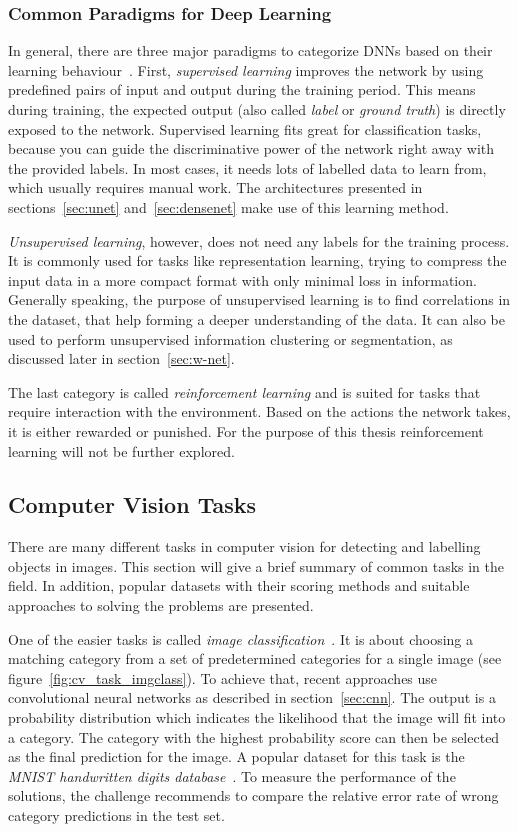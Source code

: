 \subsubsection{Common Paradigms for Deep Learning}
\label{sec:dl_paradigms}
In general, there are three major paradigms to categorize DNNs based on their learning behaviour~\cite[p.~214f]{dlma14}. First, \emph{supervised learning} improves the network by using predefined pairs of input and output during the training period. This means during training, the expected output (also called \emph{label} or \emph{ground truth}) is directly exposed to the network. Supervised learning fits great for classification tasks, because you can guide the discriminative power of the network right away with the provided labels. In most cases, it needs lots of labelled data to learn from, which usually requires manual work. The architectures presented in sections~\ref{sec:unet} and~\ref{sec:densenet} make use of this learning method.

\emph{Unsupervised learning}, however, does not need any labels for the training process. It is commonly used for tasks like representation learning, trying to compress the input data in a more compact format with only minimal loss in information. Generally speaking, the purpose of unsupervised learning is to find correlations in the dataset, that help forming a deeper understanding of the data. It can also be used to perform unsupervised information clustering or segmentation, as discussed later in section~\ref{sec:w-net}.

The last category is called \emph{reinforcement learning} and is suited for tasks that require interaction with the environment. Based on the actions the network takes, it is either rewarded or punished. For the purpose of this thesis reinforcement learning will not be further explored.

\subsection{Computer Vision Tasks}
There are many different tasks in computer vision for detecting and labelling objects in images. This section will give a brief summary of common tasks in the field. In addition, popular datasets with their scoring methods and suitable approaches to solving the problems are presented.

One of the easier tasks is called \emph{image classification}~\cite[p.~98]{DLbook16}. It is about choosing a matching category from a set of predetermined categories for a single image (see figure~\ref{fig:cv_task_imgclass}). To achieve that, recent approaches use convolutional neural networks as described in section~\ref{sec:cnn}. The output is a probability distribution which indicates the likelihood that the image will fit into a category. The category with the highest probability score can then be selected as the final prediction for the image. A popular dataset for this task is the \emph{MNIST handwritten digits database}~\cite{mnist10}. To measure the performance of the solutions, the challenge recommends to compare the relative error rate of wrong category predictions in the test set.

